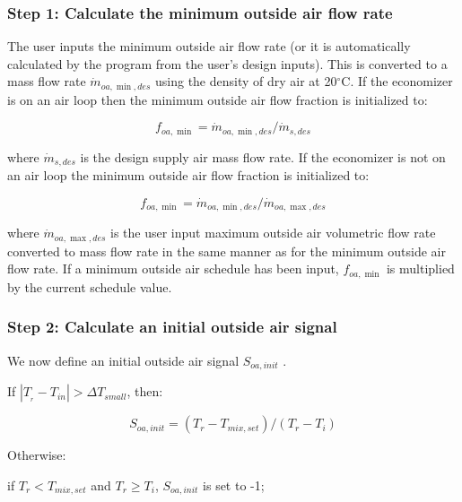 \subsubsection{Step 1: Calculate the minimum outside air flow rate}\label{step-1-Calculate-the-minimum-outside-air-flow-rate}

The user inputs the minimum outside air flow rate (or it is automatically calculated by the program from the user's design inputs). This is converted to a mass flow rate \({\dot m_{oa,\min ,des}}\) using the density of dry air at 20\(^{\circ}\)C. If the economizer is on an air loop then the minimum outside air flow fraction is initialized to:

\begin{equation}
{f_{oa,\min }} = {\dot m_{oa,\min ,des}}/{\dot m_{s,des}}
\end{equation}

where \({\dot m_{s,des}}\) is the design supply air mass flow rate. If the economizer is not on an air loop the minimum outside air flow fraction is initialized to:

\begin{equation}
{f_{oa,\min }} = {\dot m_{oa,\min ,des}}/{\dot m_{oa,\max ,des}}
\end{equation}

where \({\dot m_{oa,\max ,des}}\) is the user input maximum outside air volumetric flow rate converted to mass flow rate in the same manner as for the minimum outside air flow rate. If a minimum outside air schedule has been input, \({f_{oa,\min }}\) is multiplied by the current schedule value.

\subsubsection{Step 2: Calculate an initial outside air signal}\label{step-2-Calculate-an-initial-outside-air-signal}

We now define an initial outside air signal \({S_{oa,init}}\) .

If \(\left| {{T_{_r}} - {T_{in}}} \right| > \Delta {T_{small}}\), then:

\begin{equation}
{S_{oa,init}} = ({T_r} - {T_{mix,set}})/({T_r} - {T_i})
\end{equation}

Otherwise:

if \({T_r} < {T_{mix,set}}\) and \({T_r} \ge {T_i}\), \({S_{oa,init}}\) is set to -1;

